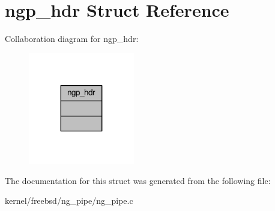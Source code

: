\hypertarget{structngp__hdr}{\section{ngp\+\_\+hdr Struct Reference}
\label{structngp__hdr}
}


Collaboration diagram for ngp\+\_\+hdr\+:
\nopagebreak
\begin{figure}[H]
\begin{center}
\leavevmode
\includegraphics[width=131pt]{structngp__hdr__coll__graph}
\end{center}
\end{figure}


The documentation for this struct was generated from the following file\+:\begin{DoxyCompactItemize}
\item 
kernel/freebsd/ng\+\_\+pipe/ng\+\_\+pipe.\+c\end{DoxyCompactItemize}
